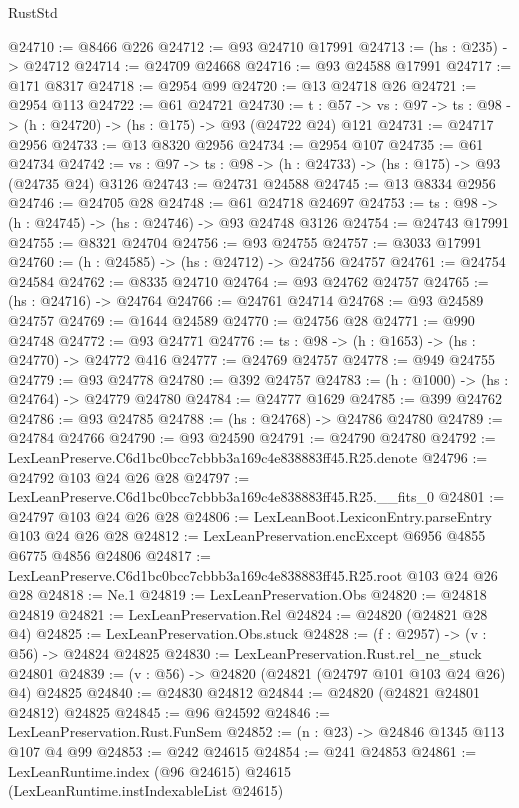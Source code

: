 \begin{lexlean}{RustStd}
\begin{coremodule}
@24710 := @8466 @226
@24712 := @93 @24710 @17991
@24713 := (hs : @235) -> @24712
@24714 := @24709 @24668
@24716 := @93 @24588 @17991
@24717 := @171 @8317
@24718 := @2954 @99
@24720 := @13 @24718 @26
@24721 := @2954 @113
@24722 := @61 @24721
@24730 := {t : @57} ->
  {vs : @97} -> {ts : @98} -> (h : @24720) -> (hs : @175) -> @93 (@24722 @24) @121
@24731 := @24717 @2956
@24733 := @13 @8320 @2956
@24734 := @2954 @107
@24735 := @61 @24734
@24742 := {vs : @97} -> {ts : @98} -> (h : @24733) -> (hs : @175) -> @93 (@24735 @24) @3126
@24743 := @24731 @24588
@24745 := @13 @8334 @2956
@24746 := @24705 @28
@24748 := @61 @24718 @24697
@24753 := {ts : @98} -> (h : @24745) -> (hs : @24746) -> @93 @24748 @3126
@24754 := @24743 @17991
@24755 := @8321 @24704
@24756 := @93 @24755
@24757 := @3033 @17991
@24760 := (h : @24585) -> (hs : @24712) -> @24756 @24757
@24761 := @24754 @24584
@24762 := @8335 @24710
@24764 := @93 @24762 @24757
@24765 := (hs : @24716) -> @24764
@24766 := @24761 @24714
@24768 := @93 @24589 @24757
@24769 := @1644 @24589
@24770 := @24756 @28
@24771 := @990 @24748
@24772 := @93 @24771
@24776 := {ts : @98} -> (h : @1653) -> (hs : @24770) -> @24772 @416
@24777 := @24769 @24757
@24778 := @949 @24755
@24779 := @93 @24778
@24780 := @392 @24757
@24783 := (h : @1000) -> (hs : @24764) -> @24779 @24780
@24784 := @24777 @1629
@24785 := @399 @24762
@24786 := @93 @24785
@24788 := (hs : @24768) -> @24786 @24780
@24789 := @24784 @24766
@24790 := @93 @24590
@24791 := @24790 @24780
@24792 := LexLeanPreserve.C6d1bc0bcc7cbbb3a169c4e838883ff45.R25.denote
@24796 := @24792 @103 @24 @26 @28
@24797 := LexLeanPreserve.C6d1bc0bcc7cbbb3a169c4e838883ff45.R25.__fits_0
@24801 := @24797 @103 @24 @26 @28
@24806 := LexLeanBoot.LexiconEntry.parseEntry @103 @24 @26 @28
@24812 := LexLeanPreservation.encExcept @6956 @4855 @6775 @4856 @24806
@24817 := LexLeanPreserve.C6d1bc0bcc7cbbb3a169c4e838883ff45.R25.root @103 @24 @26 @28
@24818 := Ne.{1}
@24819 := LexLeanPreservation.Obs
@24820 := @24818 @24819
@24821 := LexLeanPreservation.Rel
@24824 := @24820 (@24821 @28 @4)
@24825 := LexLeanPreservation.Obs.stuck
@24828 := (f : @2957) -> (v : @56) -> @24824 @24825
@24830 := LexLeanPreservation.Rust.rel_ne_stuck @24801
@24839 := (v : @56) -> @24820 (@24821 (@24797 @101 @103 @24 @26) @4) @24825
@24840 := @24830 @24812
@24844 := @24820 (@24821 @24801 @24812) @24825
@24845 := @96 @24592
@24846 := LexLeanPreservation.Rust.FunSem
@24852 := (n : @23) -> @24846 @1345 @113 @107 @4 @99
@24853 := @242 @24615
@24854 := @241 @24853
@24861 := LexLeanRuntime.index (@96 @24615) @24615 (LexLeanRuntime.instIndexableList @24615)

\end{coremodule}
\end{lexlean}
